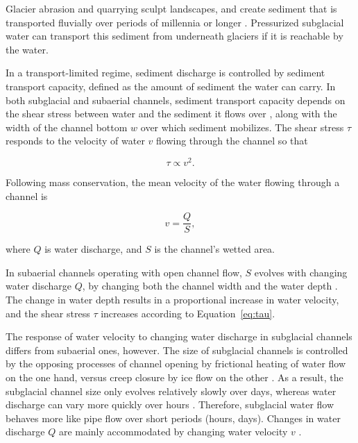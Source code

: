 \documentclass[esurf, manuscript]{copernicus}
\begin{document}
Glacier abrasion and quarrying sculpt landscapes, and create sediment that is transported fluvially over periods of millennia or longer \citep[c.f.][]{hallet1979,iverson2012,ugelvig2018}.
Pressurized subglacial water can transport this sediment from underneath glaciers \citep{walder1994,creyts2013,beaud2018,delaney2019} if it is reachable by the water.

In a transport-limited regime, sediment discharge is controlled by sediment transport capacity, defined as the amount of sediment the water can carry.
In both subglacial and subaerial channels, sediment transport capacity depends on the shear stress between water and the sediment it flows over \citep{shields1936,meyer1948,engelund1967}, along with the width of the channel bottom $w$ over which sediment mobilizes.
The shear stress $\tau$ responds to the velocity of water $v$ flowing through the channel so that
\begin{linenomath*}
  \begin{equation}
    \label{eq:tau}
    \tau \propto v^2.
  \end{equation}
\end{linenomath*}
% 
Following mass conservation, the mean velocity of the water flowing through a  channel is
\begin{linenomath*}
  \begin{equation}
    \label{eq:v}
    v = \frac{Q}{S},
  \end{equation}
\end{linenomath*}
where $Q$ is water discharge,  and $S$ is the channel's wetted area. 

In subaerial channels operating with open channel flow, $S$  evolves with changing water discharge $Q$, by changing both the channel width and the water depth \citep{leopold1953}.
The change in water depth results in a proportional increase in water velocity, and the shear stress $\tau$ increases according to Equation~\ref{eq:tau}.

The response of water velocity to changing water discharge in subglacial channels differs from subaerial ones, however.
The size of subglacial channels is controlled by the opposing processes of channel opening by frictional heating of water flow on the one hand, versus creep closure by ice flow on the other \citep{rothlisberger1972}.
As a result, the subglacial channel size only evolves relatively slowly over days, whereas water discharge can vary more quickly over hours \citep[e.g.][]{iken1986,andrews2014,nanni2020}.
Therefore, subglacial water flow behaves more like pipe flow over short periods (hours, days).
Changes in water discharge $Q$ are mainly accommodated by changing water velocity $v$ \citep[Equation~\ref{eq:v} and Figure~\ref{fig:cartoon}; ][]{alley1997}.
\end{document}
